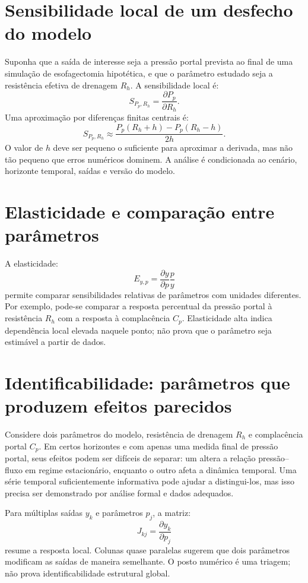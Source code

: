 \documentclass[11pt,a4paper,oneside]{book}
\newcommand{\pder}[2]{\frac{\partial #1}{\partial #2}}
\begin{document}
\section{Sensibilidade local de um desfecho do modelo}
Suponha que a saída de interesse seja a pressão portal prevista ao final de uma simulação de esofagectomia hipotética, e que o parâmetro estudado seja a resistência efetiva de drenagem $R_h$. A sensibilidade local é:
\begin{equation}
S_{P_p,R_h}=\pder{P_p}{R_h}.
\end{equation}
Uma aproximação por diferenças finitas centrais é:
\begin{equation}
S_{P_p,R_h}\approx
\frac{P_p(R_h+h)-P_p(R_h-h)}{2h}.
\end{equation}
O valor de $h$ deve ser pequeno o suficiente para aproximar a derivada, mas não tão pequeno que erros numéricos dominem. A análise é condicionada ao cenário, horizonte temporal, saídas e versão do modelo.

\section{Elasticidade e comparação entre parâmetros}
A elasticidade:
\begin{equation}
E_{y,p}=\pder{y}{p}\frac{p}{y}
\end{equation}
permite comparar sensibilidades relativas de parâmetros com unidades diferentes. Por exemplo, pode-se comparar a resposta percentual da pressão portal à resistência $R_h$ com a resposta à complacência $C_p$. Elasticidade alta indica dependência local elevada naquele ponto; não prova que o parâmetro seja estimável a partir de dados.

\section{Identificabilidade: parâmetros que produzem efeitos parecidos}
Considere dois parâmetros do modelo, resistência de drenagem $R_h$ e complacência portal $C_p$. Em certos horizontes e com apenas uma medida final de pressão portal, seus efeitos podem ser difíceis de separar: um altera a relação pressão--fluxo em regime estacionário, enquanto o outro afeta a dinâmica temporal. Uma série temporal suficientemente informativa pode ajudar a distingui-los, mas isso precisa ser demonstrado por análise formal e dados adequados.

Para múltiplas saídas $y_k$ e parâmetros $p_j$, a matriz:
\[
J_{kj}=\pder{y_k}{p_j}
\]
resume a resposta local. Colunas quase paralelas sugerem que dois parâmetros modificam as saídas de maneira semelhante. O posto numérico é uma triagem; não prova identificabilidade estrutural global.
\end{document}
